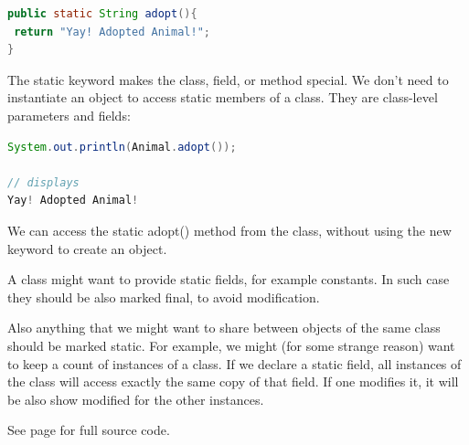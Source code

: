 \begin{lstlisting}[language=Java]
public static String adopt(){
 return "Yay! Adopted Animal!";
}
\end{lstlisting}

The static keyword makes the class, field, or method special. We don't need to instantiate an object to access static members of a class. They are class-level parameters and fields:
\begin{lstlisting}[language=Java]
System.out.println(Animal.adopt());

// displays
Yay! Adopted Animal!
\end{lstlisting}
We can access the static adopt() method from the class, without using the new keyword to create an object.

A class might want to provide static fields, for example constants. In such case they should be also marked final, to avoid modification.

Also anything that we might want to share between objects of the same class should be marked static. For example, we might (for some strange reason) want to keep a count of instances of a class. If we declare a static field, all instances of the class will access exactly the same copy of that field. If one modifies it, it will be also show modified for the other instances.

See page \pageref{App:AppendixJTest} for full source code.